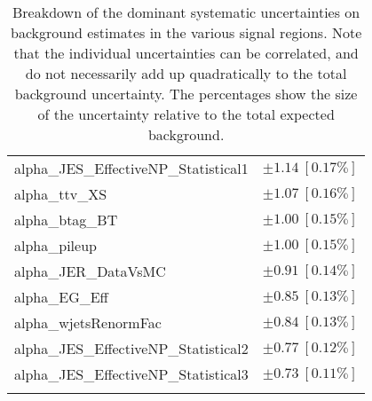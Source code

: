 \begin{table}
\begin{center}
\begin{tabular*}{\textwidth}{@{\extracolsep{\fill}}lc}
alpha\_JES\_EffectiveNP\_Statistical1         & $\pm 1.14\ [0.17\%] $       \\
alpha\_ttv\_XS         & $\pm 1.07\ [0.16\%] $       \\
alpha\_btag\_BT         & $\pm 1.00\ [0.15\%] $       \\
alpha\_pileup         & $\pm 1.00\ [0.15\%] $       \\
alpha\_JER\_DataVsMC         & $\pm 0.91\ [0.14\%] $       \\
alpha\_EG\_Eff         & $\pm 0.85\ [0.13\%] $       \\
alpha\_wjetsRenormFac         & $\pm 0.84\ [0.13\%] $       \\
alpha\_JES\_EffectiveNP\_Statistical2         & $\pm 0.77\ [0.12\%] $       \\
alpha\_JES\_EffectiveNP\_Statistical3         & $\pm 0.73\ [0.11\%] $       \\
\noalign{\smallskip}\hline\noalign{\smallskip}
\end{tabular*}
\end{center}
\caption[Breakdown of uncertainty on background estimates]{
Breakdown of the dominant systematic uncertainties on background estimates in the various signal regions.
Note that the individual uncertainties can be correlated, and do not necessarily add up quadratically to 
the total background uncertainty. The percentages show the size of the uncertainty relative to the total expected background.
\label{table.results.bkgestimate.uncertainties.TRLMEM_cuts}}
\end{table}
%